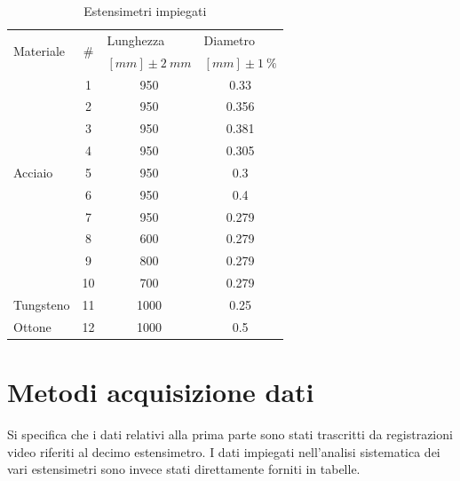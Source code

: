 \documentclass[a4paper,11pt,oneside]{article}
\begin{document}
\begin{table}[h!]
	\centering
	\begin{tabular}{|l|c|c|c|}  
\hline
		    \multirow{2}{*}{Materiale} & \multirow{2}{*}{\#}& \multicolumn{1}{l|}{Lunghezza}        & \multicolumn{1}{l|}{Diametro}\\ 
		    &&$[\si{mm}] \pm\SI{2}{mm}$&$[\si{mm}] \pm\SI{1}{\percent}$\\  
\hline
\multirow{9}{*}{Acciaio} & {\cellcolor[rgb]{0.85,0.85,0.85}}1  & {\cellcolor[rgb]{0.85,0.85,0.85}}950  & {\cellcolor[rgb]{0.85,0.85,0.85}}0.33   \\
& 2 & 950 & 0.356  \\
& {\cellcolor[rgb]{0.85,0.85,0.85}}3  & {\cellcolor[rgb]{0.85,0.85,0.85}}950  & {\cellcolor[rgb]{0.85,0.85,0.85}}0.381  \\
& 4 & 950 & 0.305  \\ & {\cellcolor[rgb]{0.85,0.85,0.85}}5  & {\cellcolor[rgb]{0.85,0.85,0.85}}950  & {\cellcolor[rgb]{0.85,0.85,0.85}}0.3    \\
& 6 & 950 & 0.4                                        \\
& {\cellcolor[rgb]{0.85,0.85,0.85}}7  & {\cellcolor[rgb]{0.85,0.85,0.85}}950  & {\cellcolor[rgb]{0.85,0.85,0.85}}0.279  \\
& 8 & 600 & 0.279                                      \\
& {\cellcolor[rgb]{0.85,0.85,0.85}}9  & {\cellcolor[rgb]{0.85,0.85,0.85}}800  & {\cellcolor[rgb]{0.85,0.85,0.85}}0.279  \\
& 10 & 700 & 0.279                                      \\
\hline
Tungsteno & {\cellcolor[rgb]{0.85,0.85,0.85}}11 &{\cellcolor[rgb]{0.85,0.85,0.85}} 1000 &{\cellcolor[rgb]{0.85,0.85,0.85}} 0.25\\
\hline
Ottone                   & 12 & 1000 & 0.5\\ \hline
\end{tabular}
	\caption{Estensimetri impiegati}
	\label{tab:caratteristiche_estensimetri}
\end{table}



\section{Metodi acquisizione dati}
Si specifica che i dati relativi alla prima parte sono stati trascritti da registrazioni video riferiti al decimo estensimetro. I dati impiegati nell'analisi sistematica dei vari estensimetri sono invece stati direttamente forniti in tabelle.\\
\end{document}
